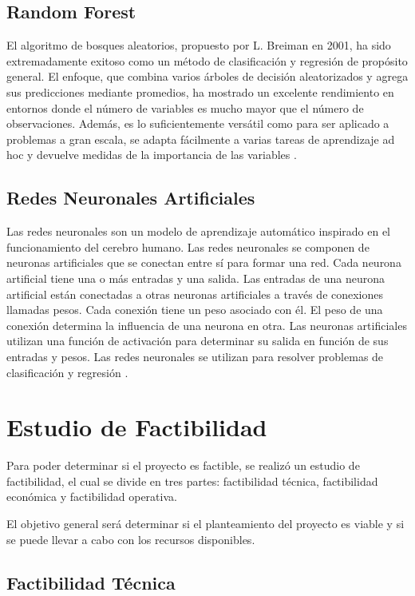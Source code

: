 \subsection{Random Forest}

El algoritmo de bosques aleatorios, propuesto por L. Breiman en 2001, ha
sido extremadamente exitoso como un método de clasificación y regresión de propósito
general. El enfoque, que combina varios árboles de decisión aleatorizados y
agrega sus predicciones mediante promedios, ha mostrado
un excelente rendimiento en entornos donde el número de variables es
mucho mayor que el número de observaciones. Además, es lo suficientemente versátil
como para ser aplicado a problemas a gran escala, se adapta fácilmente a
varias tareas de aprendizaje ad hoc y devuelve medidas de la importancia de las variables
\cite{biau2016random}.

\subsection{Redes Neuronales Artificiales}

Las redes neuronales son un modelo de aprendizaje automático inspirado en el
funcionamiento del cerebro humano. Las redes neuronales se componen de neuronas
artificiales que se conectan entre sí para formar una red. Cada neurona artificial
tiene una o más entradas y una salida. Las entradas de una neurona artificial
están conectadas a otras neuronas artificiales a través de conexiones llamadas
pesos. Cada conexión tiene un peso asociado con él. El peso de una conexión
determina la influencia de una neurona en otra. Las neuronas artificiales
utilizan una función de activación para determinar su salida en función de sus
entradas y pesos. Las redes neuronales se utilizan para resolver problemas de
clasificación y regresión \cite{muller1995neural}.

\section{Estudio de Factibilidad}

Para poder determinar si el proyecto es factible, se realizó un estudio de
factibilidad, el cual se divide en tres partes: factibilidad técnica, factibilidad
económica y factibilidad operativa.

El objetivo general será determinar si el planteamiento del proyecto es viable
y si se puede llevar a cabo con los recursos disponibles.

\subsection{Factibilidad Técnica}

